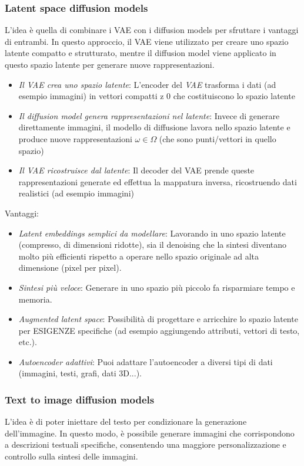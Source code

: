 \subsubsection{Latent space diffusion models}
L'idea è quella di combinare i VAE con i diffusion models per sfruttare i vantaggi di entrambi. In questo approccio, il VAE viene utilizzato per creare uno spazio latente compatto e strutturato, mentre il diffusion model viene applicato in questo spazio latente per generare nuove rappresentazioni.
\begin{itemize}
	\item \textit{Il VAE crea uno spazio latente}: L’encoder del \textit{VAE} trasforma i dati (ad esempio immagini) in vettori compatti z 0 che costituiscono lo spazio latente
	\item \textit{Il diffusion model genera rappresentazioni nel latente}: Invece di generare direttamente immagini, il modello di diffusione lavora nello spazio latente e produce nuove rappresentazioni $ \omega \in  \Omega  $ (che sono punti/vettori in quello spazio)
	\item \textit{Il VAE ricostruisce dal latente}: Il decoder del VAE prende queste rappresentazioni generate ed effettua la mappatura inversa, ricostruendo dati realistici (ad esempio immagini)
\end{itemize}
Vantaggi:

\begin{itemize}
	\item \textit{Latent embeddings semplici da modellare}: Lavorando in uno spazio latente (compresso, di dimensioni ridotte), sia il denoising che la sintesi diventano molto più efficienti rispetto a operare nello spazio originale ad alta dimensione (pixel per pixel).
	\item \textit{Sintesi più veloce}: Generare in uno spazio più piccolo fa risparmiare tempo e memoria.
	\item \textit{Augmented latent space}: Possibilità di progettare e arricchire lo spazio latente per ESIGENZE specifiche (ad esempio aggiungendo attributi, vettori di testo, etc.).
	\item \textit{Autoencoder adattivi}: Puoi adattare l’autoencoder a diversi tipi di dati (immagini, testi, grafi, dati 3D...).
\end{itemize}

\subsubsection{Text to image diffusion models}
L'idea è di poter iniettare del testo per condizionare la generazione dell'immagine. In questo modo, è possibile generare immagini che corrispondono a descrizioni testuali specifiche, consentendo una maggiore personalizzazione e controllo sulla sintesi delle immagini.

